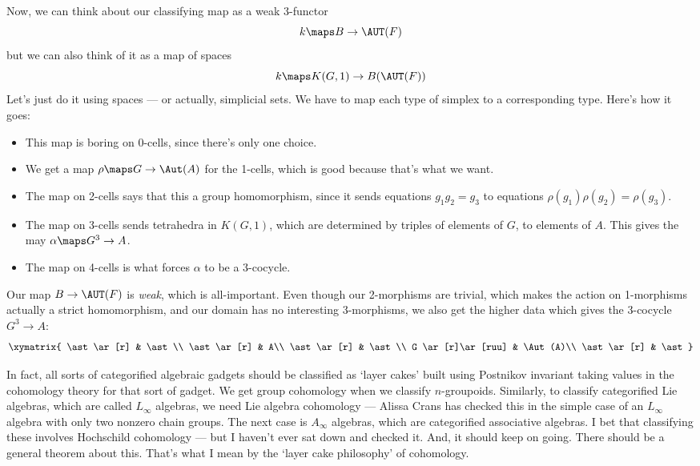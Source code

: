 \documentclass{amsart}
\begin{document}
Now, we can think about our classifying map as a weak 3-functor
\[k\maps B \to \AUT(F)\]
but we can also think of it as a map of spaces
\[k\maps K(G,1) \to B(\AUT(F))\]
Let's just do it using spaces --- or actually, simplicial sets.  We have
to map each type of simplex to a corresponding type.  Here's how it
goes:
\begin{itemize}
\item This map is boring on 0-cells, since there's only one choice.
\item We get a map $\rho\maps G\to \Aut(A)$ for the 1-cells, which is good
  because that's what we want.
\item The map on 2-cells says that this a group homomorphism, since it
  sends equations $g_1g_2=g_3$ to equations
  $\rho(g_1)\rho(g_2)=\rho(g_3)$.
\item The map on 3-cells sends tetrahedra in $K(G,1)$, which are
  determined by triples of elements of $G$, to elements of $A$.  This
  gives the may $\alpha\maps G^3\to A$.
\item The map on 4-cells is what forces $\alpha$ to be a 3-cocycle.
\end{itemize}

Our map $B\to \AUT(F)$ is \emph{weak}, which is all-important.  Even
though our 2-morphisms are trivial, which makes the action on
1-morphisms actually a strict homomorphism, and our domain has no
interesting 3-morphisms, we also get the higher data which gives
the 3-cocycle $G^3\to A$:
\[\xymatrix{
  \ast \ar[r] & \ast\\
  \ast \ar[r] & A\\
  \ast \ar[r] & \ast\\
  G \ar[r]\ar[ruu] & \Aut(A)\\
  \ast \ar[r] & \ast  
}\]

In fact, all sorts of categorified algebraic
gadgets should be classified as `layer cakes' built using
Postnikov invariant taking values in the cohomology theory for that sort
of gadget.  We get group cohomology when we 
classify $n$-groupoids.   Similarly, to classify categorified Lie
algebras, which are called $L_\infty$ algebras, we need Lie algebra 
cohomology --- Alissa Crans has checked this in the simple case of an
$L_\infty$ algebra with only two nonzero chain groups.  The next case is 
$A_\infty$ algebras, which are categorified associative algebras.
I bet that classifying these involves Hochschild cohomology --- 
but I haven't ever sat down and checked it.  And, it should keep on
going.  There should be a general theorem about this.  That's
what I mean by the `layer cake philosophy' of cohomology.
\end{document}
